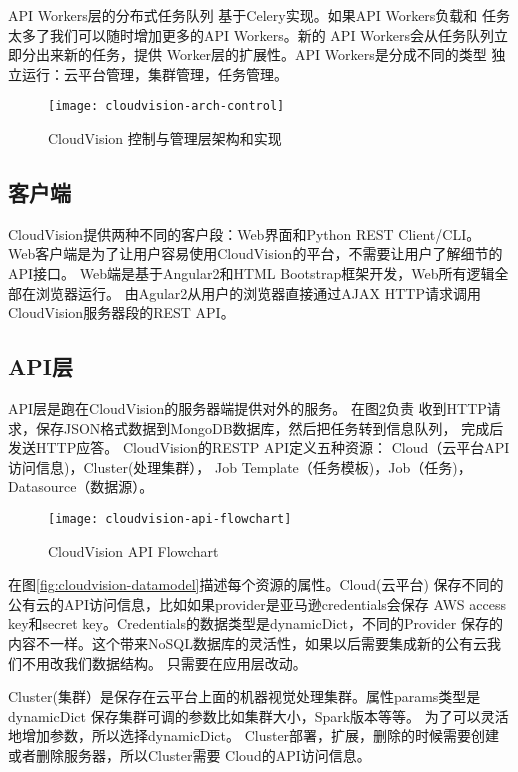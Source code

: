 API Workers层的分布式任务队列
基于Celery实现。\cite{celery}如果API Workers负载和
任务太多了我们可以随时增加更多的API Workers。新的
API Workers会从任务队列立即分出来新的任务，提供
Worker层的扩展性。API Workers是分成不同的类型
独立运行：云平台管理，集群管理，任务管理。

\begin{figure}[h]
  \centering
    \texttt{[image: cloudvision-arch-control]}
  \caption{CloudVision 控制与管理层架构和实现}
  \label{fig:cloudvision-arch-control}
\end{figure}

\subsection{客户端}
CloudVision提供两种不同的客户段：Web界面和Python REST Client/CLI。
Web客户端是为了让用户容易使用CloudVision的平台，不需要让用户了解细节的API接口。
Web端是基于Angular2和HTML Bootstrap框架开发，Web所有逻辑全部在浏览器运行。
由Agular2从用户的浏览器直接通过AJAX HTTP请求调用CloudVision服务器段的REST API。

\subsection{API层}
API层是跑在CloudVision的服务器端提供对外的服务。
在图\ref{fig:cloudvision-api-flowchart}负责
收到HTTP请求，保存JSON格式数据到MongoDB数据库，然后把任务转到信息队列，
完成后发送HTTP应答。 CloudVision的RESTP API定义五种资源：
Cloud（云平台API访问信息)，Cluster(处理集群），
Job Template（任务模板)，Job（任务)，Datasource（数据源）。
\begin{figure}[h]
  \centering
    \texttt{[image: cloudvision-api-flowchart]}
  \caption{CloudVision API Flowchart}
  \label{fig:cloudvision-api-flowchart}
\end{figure}


在图\ref{fig:cloudvision-datamodel}描述每个资源的属性。Cloud(云平台)
保存不同的公有云的API访问信息，比如如果provider是亚马逊credentials会保存
AWS access key和secret key。Credentials的数据类型是dynamicDict，不同的Provider
保存的内容不一样。这个带来NoSQL数据库的灵活性，如果以后需要集成新的公有云我们不用改我们数据结构。
只需要在应用层改动。

Cluster(集群）是保存在云平台上面的机器视觉处理集群。属性params类型是dynamicDict
保存集群可调的参数比如集群大小，Spark版本等等。
为了可以灵活地增加参数，所以选择dynamicDict。
Cluster部署，扩展，删除的时候需要创建或者删除服务器，所以Cluster需要
Cloud的API访问信息。

